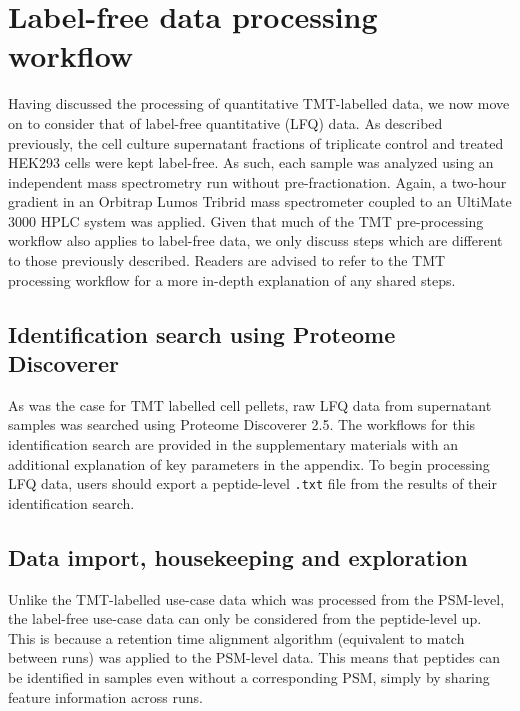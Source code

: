 \documentclass[9pt,a4paper,]{extarticle}
\begin{document}
\hypertarget{label-free-data-processing-workflow}{%
\section{Label-free data processing workflow}\label{label-free-data-processing-workflow}}

Having discussed the processing of quantitative TMT-labelled data, we now move
on to consider that of label-free quantitative (LFQ) data. As described
previously, the cell culture supernatant fractions of triplicate control and
treated HEK293 cells were kept label-free. As such, each sample was analyzed using
an independent mass spectrometry run without pre-fractionation. Again, a two-hour
gradient in an Orbitrap Lumos Tribrid mass spectrometer coupled to an UltiMate
3000 HPLC system was applied. Given that much of the TMT pre-processing workflow
also applies to label-free data, we only discuss steps which are different to
those previously described. Readers are advised to refer to the TMT processing
workflow for a more in-depth explanation of any shared steps.

\hypertarget{identification-search-using-proteome-discoverer}{%
\subsection{Identification search using Proteome Discoverer}\label{identification-search-using-proteome-discoverer}}

As was the case for TMT labelled cell pellets, raw LFQ data from supernatant
samples was searched using Proteome Discoverer 2.5. The workflows for this
identification search are provided in the supplementary materials with an
additional explanation of key parameters in the appendix. To begin processing
LFQ data, users should export a peptide-level \texttt{.txt} file from the results of
their identification search.

\hypertarget{data-import-housekeeping-and-exploration-1}{%
\subsection{Data import, housekeeping and exploration}\label{data-import-housekeeping-and-exploration-1}}

Unlike the TMT-labelled use-case data which was processed from the PSM-level, the
label-free use-case data can only be considered from the peptide-level up. This
is because a retention time alignment algorithm (equivalent to match between runs)
was applied to the PSM-level data. This means that peptides can be identified in
samples even without a corresponding PSM, simply by sharing feature information
across runs.
\end{document}
